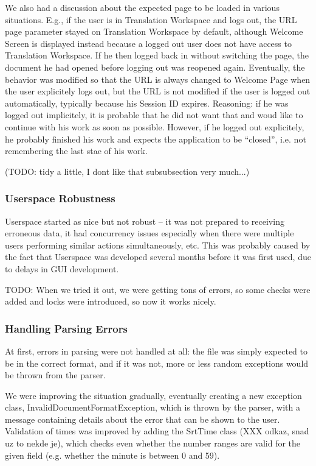 We also had a discussion about the expected page to be loaded in various situations. E.g., if the user is in Translation Workspace and logs out, the URL page parameter stayed on Translation Workspace by default, although Welcome Screen is displayed instead because a logged out user does not have access to Translation Workspace. If he then logged back in without switching the page, the document he had opened before logging out was reopened again.
Eventually, the behavior was modified so that the URL is always changed to Welcome Page when the user explicitely logs out, but the URL is not modified if the user is logged out automatically, typically because his Session ID expires. Reasoning: if he was logged out implicitely, it is probable that he did not want that and woud like to continue with his work as soon as possible. However, if he logged out explicitely, he probably finished his work and expects the application to be ``closed'', i.e. not remembering the last stae of his work.

(TODO: tidy a little, I dont like that subsubsection very much...)

\subsubsection{Userspace Robustness}

Userspace started as nice but not robust -- it was not prepared to receiving erroneous data, it had concurrency issues especially when there were multiple users performing similar actions simultaneously, etc. This was probably caused by the fact that Userspace was developed several months before it was first used, due to delays in GUI development.

TODO: When we tried it out, we were getting tons of errors, so some checks were added and locks were introduced, so now it works nicely.

\subsubsection{Handling Parsing Errors}

At first, errors in parsing were not handled at all: the file was simply expected to be in the correct format, and if it was not, more or less random exceptions would be thrown from the parser.

We were improving the situation gradually, eventually creating a new exception class, InvalidDocumentFormatException, which is thrown by the parser, with a message containing details about the error that can be shown to the user.
Validation of times was improved by adding the SrtTime class (XXX odkaz, snad uz to nekde je), which checks even whether the number ranges are valid for the given field (e.g. whether the minute is between 0 and 59).


